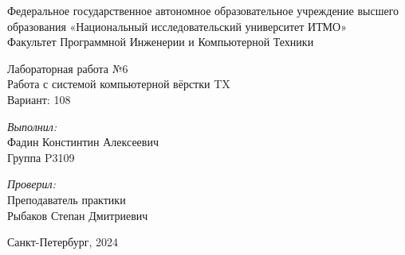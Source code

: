 \begin{center}
\large Федеральное государственное автономное образовательное учреждение высшего образования «Национальный исследовательский университет ИТМО»\\
Факультет Программной Инженерии и Компьютерной Техники\\
\hfill 


\vspace{7cm}
\Large Лабораторная работа №6 \\
Работа с системой компьютерной вёрстки T\raisebox{-0.3em}{E}X\\
Вариант: 108\\
\end{center}

\vspace{7.5cm}
 
\begin{flushright}
\textit{Выполнил:}\\
Фадин Констинтин Алексеевич\\
Группа P3109\

\textit{Проверил:}\\
Преподаватель практики\\
Рыбаков Степан Дмитриевич\\
\end{flushright}
 
\vfill

\begin{center} Санкт-Петербург, 2024 \end{center}